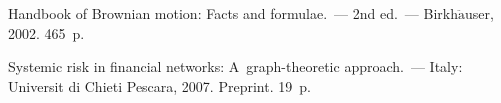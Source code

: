 \begin{multicols}{2}
{{\begin{thebibliography}{99}
Handbook of Brownian motion: Facts and formulae.~--- 2nd ed.~--- Birkh$\ddot{\mbox{a}}$user,
2002. 465~p.

  Systemic risk in financial networks: 
A~graph-theoretic approach.~--- Italy: 
\mbox{Universit{\!}} di Chieti Pescara,
2007. Preprint. 19~p.















\end{thebibliography}}}
\end{multicols}
